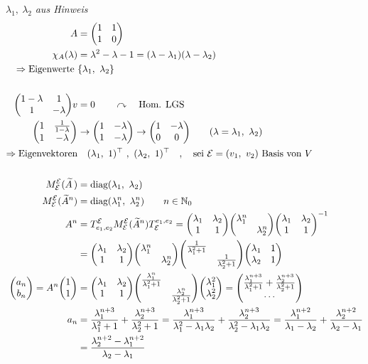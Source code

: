 \documentclass[a4paper, 12pt]{scrartcl}
\begin{document}
$\lambda_1,\ \lambda_2$ \emph{aus Hinweis}
\begin{align*}
	A &= \mqty(1 & 1 \\ 1 & 0) \\
	\chi_A(\lambda) &= \lambda^2 - \lambda - 1 = (\lambda - \lambda_1)(\lambda - \lambda_2) \\
	\Rightarrow \text{Eigenwerte}\ &\qty{\lambda_1,\ \lambda_2} \\\\
	\mqty( 1 - \lambda & 1 \\ 1 & -\lambda)v &= 0 \qquad \curvearrowright \quad \text{Hom. LGS} \\
	\mqty( 1 & \frac 1 {1-\lambda} \\ 1 & - \lambda) &\rightarrow \mqty( 1 & -\lambda \\ 1 & - \lambda)
	\rightarrow \mqty(1 & -\lambda \\ 0 & 0) \qquad (\lambda = \lambda_1,\ \lambda_2) \\
	\Rightarrow \text{Eigenvektoren} &\quad (\lambda_1,\ 1)^\top ~,~ (\lambda_2,\ 1)^\top \quad,\quad \text{sei } \mathcal E = (v_1,\ v_2) \text{ Basis von $V$}\\\\
	M_{\mathcal E}^{\mathcal E}(\widetilde A\,) &= \textrm{diag}(\lambda_1,\ \lambda_2) \\
	M_{\mathcal E}^{\mathcal E}(\widetilde A^n) &= \textrm{diag}(\lambda_1^n,\ \lambda_2^n) \qquad n \in \mathbb{N}_0 \\
	A^n &= T^{\mathcal E}_{e_1,e_2} M^{\mathcal E}_{\mathcal E}(\widetilde A^n) T_{\mathcal E}^{e_1,e_2} = \mqty(\lambda_1 & \lambda_2 \\ 1 & 1) \mqty(\diagonalmatrix{\lambda_1^n, \lambda_2^n}) \mqty(\lambda_1 & \lambda_2 \\ 1 & 1)^{-1} \\
	&= \mqty(\lambda_1 & \lambda_2 \\ 1 & 1) \mqty(\diagonalmatrix{\lambda_1^n, \lambda_2^n}) \mqty(\diagonalmatrix{\frac 1 {\lambda_1^2+1}, \frac 1 {\lambda_2^2+1}})\mqty(\lambda_1 & 1 \\ \lambda_2 & 1) \\
	\mqty(a_n \\ b_n) = A^n \mqty(1 \\ 1) &= \mqty(\lambda_1 & \lambda_2 \\ 1 & 1) \mqty(\diagonalmatrix{\frac{\lambda_1^n}{\lambda_1^2+1}, \frac{\lambda_2^n}{\lambda_2^2+1}}) \mqty(\lambda_1^2 \\ \lambda_2^2) = \mqty(\frac{\lambda_1^{n+3}}{\lambda_1^2+1} + \frac{\lambda_2^{n+3}}{\lambda_2^2+1} \\ \cdots) \\
	a_n &= \frac{\lambda_1^{n+3}}{\lambda_1^2+1} + \frac{\lambda_2^{n+3}}{\lambda_2^2+1} = \frac{\lambda_1^{n+3}}{\lambda_1^2-\lambda_1\lambda_2} + \frac{\lambda_2^{n+3}}{\lambda_2^2-\lambda_1\lambda_2} = \frac{\lambda_1^{n+2}}{\lambda_1-\lambda_2}+ \frac{\lambda_2^{n+2}}{\lambda_2-\lambda_1} \\
	&= \frac{\lambda_2^{n+2}-\lambda_1^{n+2}}{\lambda_2-\lambda_1}
\end{align*}
\newpage
\end{document}
